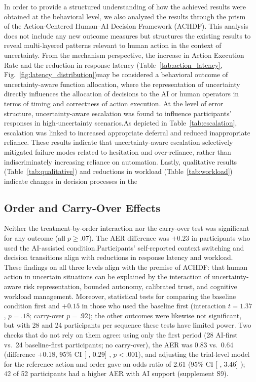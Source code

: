 \documentclass[journal]{IEEEtran}
\theoremstyle{plain}
\theoremstyle{definition}
\providecommand{\DIFaddtex}[1]{{\protect\color{blue} \sf #1}} %
\providecommand{\DIFdeltex}[1]{{\protect\color{red} \scriptsize #1}} %
\providecommand{\DIFaddbegin}{} %
\providecommand{\DIFaddend}{} %
\providecommand{\DIFdelbegin}{} %
\providecommand{\DIFdelend}{} %
\providecommand{\DIFadd}[1]{\texorpdfstring{\DIFaddtex{#1}}{#1}} %
\providecommand{\DIFdel}[1]{\texorpdfstring{\DIFdeltex{#1}}{}} %
\newcommand{\DIFscaledelfig}{0.5}
\newlength{\DIFdelgraphicswidth} %
\newlength{\DIFdelgraphicsheight} %
\newcommand{\DIFaddincludegraphics}[2][]{{\color{blue}\fbox{\DIFOincludegraphics[#1]{#2}}}} %
\newcommand{\DIFdelincludegraphics}[2][]{%
\sbox{\DIFdelgraphicsbox}{\DIFOincludegraphics[#1]{#2}}%
\settoboxwidth{\DIFdelgraphicswidth}{\DIFdelgraphicsbox} %
\settoboxtotalheight{\DIFdelgraphicsheight}{\DIFdelgraphicsbox} %
\scalebox{\DIFscaledelfig}{%
\parbox[b]{\DIFdelgraphicswidth}{\usebox{\DIFdelgraphicsbox}\\[-\baselineskip] \rule{\DIFdelgraphicswidth}{0em}}\llap{\resizebox{\DIFdelgraphicswidth}{\DIFdelgraphicsheight}{%
\setlength{\unitlength}{\DIFdelgraphicswidth}%
\begin{picture}(1,1)%
\thicklines\linethickness{2pt} %
{\color[rgb]{1,0,0}\put(0,0){\framebox(1,1){}}}%
{\color[rgb]{1,0,0}\put(0,0){\line( 1,1){1}}}%
{\color[rgb]{1,0,0}\put(0,1){\line(1,-1){1}}}%
\end{picture}%
}\hspace*{3pt}}} %
} %
\DeclareRobustCommand{\DIFaddbegin}{\DIFOaddbegin \let\includegraphics\DIFaddincludegraphics} %
\DeclareRobustCommand{\DIFaddend}{\DIFOaddend \let\includegraphics\DIFOincludegraphics} %
\DeclareRobustCommand{\DIFdelbegin}{\DIFOdelbegin \let\includegraphics\DIFdelincludegraphics} %
\DeclareRobustCommand{\DIFdelend}{\DIFOaddend \let\includegraphics\DIFOincludegraphics} %
\begin{document}
    \DIFdelbegin \DIFdel{In order to provide a structured understanding of how the achieved results were obtained at the behavioral level, we also analyzed the results through the prism of the Action-Centered Human--AI Decision Framework (ACHDF). This analysis does not include any new outcome measures but structures the existing results to reveal multi-layered patterns relevant to human action in the context of uncertainty. From the mechanism perspective, the increase in Action Execution Rate and the reduction in response latency (Table~\ref{tab:action_latency}, Fig.~\ref{fig:latency_distribution})may be considered a behavioral outcome of uncertainty-aware function allocation, where the representation of uncertainty directly influences the allocation of decisions to the AI or human operators in terms of timing and correctness of action execution. At the level of error structure, uncertainty-aware escalation was found to influence participants’ responses in high-uncertainty scenarios.As depicted in Table~\ref{tab:escalation}, escalation was linked to increased appropriate deferral and reduced inappropriate reliance. These results indicate that uncertainty-aware escalation selectively mitigated failure modes related to hesitation and over-reliance, rather than indiscriminately increasing reliance on automation.
Lastly, qualitative results (Table~\ref{tab:qualitative}) and reductions in workload (Table~\ref{tab:workload}) indicate changes in decision processes in the }\DIFdelend \DIFaddbegin \subsection{\DIFadd{Order and Carry-Over Effects}}
    \label{sec:res_order}
    \DIFadd{Neither the treatment-by-order interaction nor the carry-over test was significant for any outcome (all $p \geq .07$). The AER difference was $+0.23$ in participants who used the }\DIFaddend AI-assisted \DIFdelbegin \DIFdel{condition.Participants’ self-reported context switching and decision transitions align with reductions in response latency and workload. These findings on all three levels align with the premise of ACHDF: that human action in uncertain situations can be explained by the interaction of uncertainty-aware risk representation, bounded autonomy, calibrated trust, and cognitive workload management.
    Moreover, statistical tests for comparing the baseline }\DIFdelend \DIFaddbegin \DIFadd{condition first and $+0.15$ in those who used the baseline first (interaction $t=1.37$, $p=.18$; carry-over $p=.92$); the other outcomes were likewise not significant, but with 28 and 24 participants per sequence these tests have limited power. Two checks that do not rely on them agree: using only the first period (28 AI-first vs.\ 24 baseline-first participants; no carry-over), the AER was 0.83 vs.\ 0.64 (difference $+0.18$, 95\% CI }[\DIFadd{0.08, 0.29}]\DIFadd{, $p<.001$), }\DIFaddend and \DIFaddbegin \DIFadd{adjusting the trial-level model for the reference action and order gave an odds ratio of 2.61 (95\% CI }[\DIFadd{1.97, 3.46}]\DIFadd{); 42 of 52 participants had a higher AER with AI support (supplement S9).
}
\end{document}
